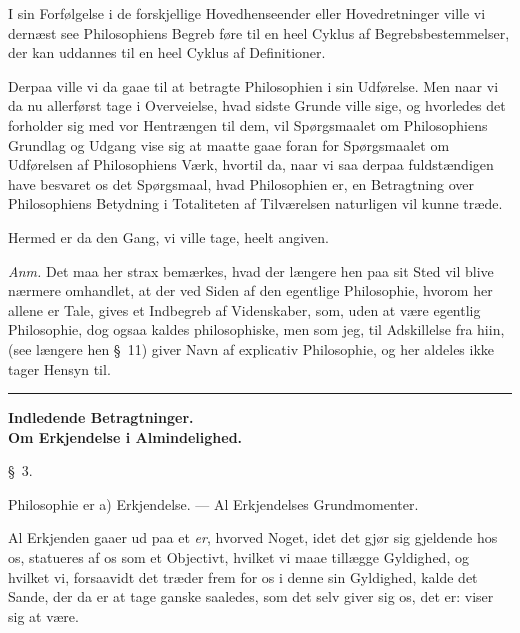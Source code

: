 \documentclass[12pt,a4paper]{book}
\newcommand{\grouphead}[1]{%
  \bigskip\begin{center}\large\textbf{#1}\end{center}\smallskip}
\newcommand{\apage}[1]{\marginnote{\footnotesize\textit{[#1]}}}
\begin{document}
I sin Forfølgelse i de forskjellige Hovedhenseender eller Hovedretninger ville
vi dernæst see Philosophiens Begreb føre til en heel Cyklus af
Begrebsbestemmelser, der kan uddannes til en heel Cyklus af Definitioner.

Derpaa ville vi da gaae til at betragte Philosophien i sin Udførelse. Men naar
vi da nu allerførst tage i Overveielse, hvad sidste Grunde ville sige, og
hvorledes det forholder sig med vor Hentrængen til dem, vil Spørgsmaalet om
Philosophiens Grundlag og Udgang vise sig at maatte gaae foran for Spørgsmaalet
om Udførelsen af Philosophiens Værk, hvortil da, naar vi saa derpaa
fuldstændigen have besvaret os det Spørgsmaal, hvad Philosophien er, en
Betragtning over Philosophiens Betydning i Totaliteten af Tilværelsen naturligen
vil kunne træde.

Hermed er da den Gang, vi ville tage, heelt angiven.

{\small\emph{Anm.} Det maa her strax bemærkes, hvad der længere hen paa sit
Sted vil blive nærmere omhandlet, at der ved Siden af den egentlige
Philosophie, hvorom her allene er Tale, gives et Indbegreb af Videnskaber, som,
uden at være egentlig Philosophie, dog ogsaa kaldes philosophiske, men som jeg,
til Adskillelse fra hiin, (see længere hen \S~11) giver Navn af explicativ
Philosophie, og her aldeles ikke tager Hensyn til.\par}

\begin{center}\rule{0.18\linewidth}{0.4pt}\end{center}

\grouphead{Indledende Betragtninger.\\[2pt]\normalsize Om Erkjendelse i Almindelighed.} \apage{7} 

\begin{center}\large\S~3.\end{center}
\begin{center}Philosophie er a) Erkjendelse. --- Al Erkjendelses Grundmomenter.\end{center}

Al Erkjenden gaaer ud paa et \emph{er}, hvorved Noget, idet det gjør sig
gjeldende hos os, statueres af os som et Objectivt, hvilket vi maae tillægge
Gyldighed, og hvilket vi, forsaavidt det træder frem for os i denne sin
Gyldighed, kalde det Sande, der da er at tage ganske saaledes, som det selv
giver sig os, det er: viser sig at være.
\end{document}
